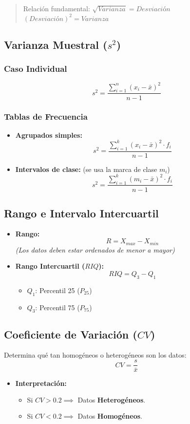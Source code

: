 \documentclass[11pt]{article}
\begin{document}
\begin{quote}
Relación fundamental:
\(\sqrt{Varianza} = Desviación\)
\((Desviación)^2 = Varianza\)
\end{quote}

\subsection{Varianza Muestral (\(s^2\))}
\label{sec:org23ab1ae}
\subsubsection{Caso Individual}
\label{sec:org41f5fe5}
$$\displaystyle s^2 = \frac{\sum_{i=1}^{n} (x_i - \bar{x})^2}{n - 1}$$

\subsubsection{Tablas de Frecuencia}
\label{sec:org1bc72ba}
\begin{itemize}
\item \textbf{Agrupados simples:}
$$\displaystyle s^2 = \frac{\sum_{i=1}^{k} (x_i - \bar{x})^2 \cdot f_i}{n - 1}$$
\item \textbf{Intervalos de clase:} (se usa la marca de clase \(m_i\))
$$\displaystyle s^2 = \frac{\sum_{i=1}^{k} (m_i - \bar{x})^2 \cdot f_i}{n - 1}$$
\end{itemize}

\subsection{Rango e Intervalo Intercuartil}
\label{sec:org3d44cf2}
\begin{itemize}
\item \textbf{Rango:}
$$\displaystyle R = X_{max} - X_{min}$$
\emph{(Los datos deben estar ordenados de menor a mayor)}
\item \textbf{Rango Intercuartil (\(RIQ\)):}
$$\displaystyle RIQ = Q_3 - Q_1$$
\begin{itemize}
\item \(Q_1\): Percentil 25 (\(P_{25}\))
\item \(Q_3\): Percentil 75 (\(P_{75}\))
\end{itemize}
\end{itemize}

\subsection{Coeficiente de Variación (\(CV\))}
\label{sec:org7c247d6}
Determina qué tan homogéneos o heterogéneos son los datos:
$$\displaystyle CV = \frac{s}{\bar{x}}$$

\begin{itemize}
\item \textbf{Interpretación:}
\begin{itemize}
\item Si \(CV > 0.2 \implies\) Datos \textbf{Heterogéneos}.
\item Si \(CV < 0.2 \implies\) Datos \textbf{Homogéneos}.
\end{itemize}
\end{itemize}
\end{document}
